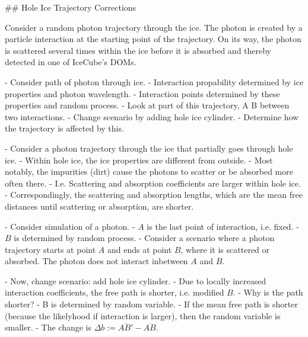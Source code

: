 
## Hole Ice Trajectory Corrections

Consider a random photon trajectory through the ice. The photon is created by a particle interaction at the starting point of the trajectory. On its way, the photon is scattered several times within the ice before it is absorbed and thereby detected in one of IceCube's DOMs.


- Consider path of photon through ice.
- Interaction propability determined by ice properties and photon wavelength.
- Interaction points determined by these properties and random process.
- Look at part of this trajectory, A B between two interactions.
- Change scenario by adding hole ice cylinder.
- Determine how the trajectory is affected by this.


- Consider a photon trajectory through the ice that partially goes through hole ice.
- Within hole ice, the ice properties are different from outside.
- Most notably, the impurities (dirt) cause the photons to scatter or be absorbed more often there.
- I.e. Scattering and absorption coefficients are larger within hole ice.
- Correspondingly, the scattering and absorption lengths, which are the mean free distances until scattering or absorption, are shorter.


- Consider simulation of a photon.
- $A$ is the last point of interaction, i.e. fixed.
- $B$ is determined by random process.
- Consider a scenario where a photon trajectory starts at point $A$ and ends at point $B$, where it is scattered or absorbed. The photon does not interact inbetween $A$ and $B$.


- Now, change scenario: add hole ice cylinder.
- Due to locally increased interaction coefficients, the free path is shorter, i.e. modified $B$.
- Why is the path shorter?
- B is determined by random variable.
- If the mean free path is shorter (because the likelyhood if interaction is larger), then the random variable is smaller.
- The change is $\Delta b:= \overline{AB'} - \overline{AB}$.

